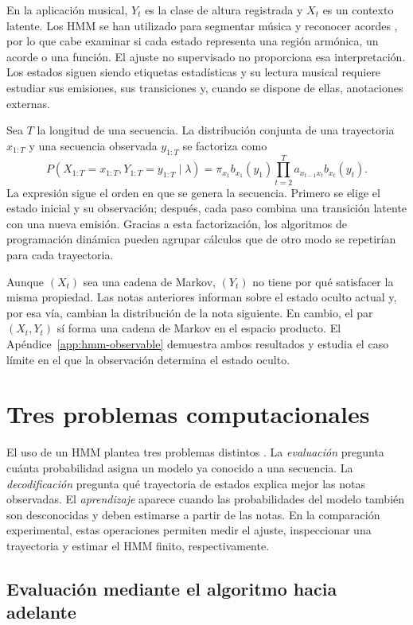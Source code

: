 En la aplicación musical, $Y_t$ es la clase de altura registrada y $X_t$ es un contexto latente. Los HMM se han utilizado para segmentar música y reconocer acordes \cite{sheh2003}, por lo que cabe examinar si cada estado representa una región armónica, un acorde o una función. El ajuste no supervisado no proporciona esa interpretación. Los estados siguen siendo etiquetas estadísticas y su lectura musical requiere estudiar sus emisiones, sus transiciones y, cuando se dispone de ellas, anotaciones externas.

Sea $T$ la longitud de una secuencia. La distribución conjunta de una trayectoria $x_{1:T}$ y una secuencia observada $y_{1:T}$ se factoriza como
\[
P(X_{1:T}=x_{1:T},Y_{1:T}=y_{1:T}\mid\lambda)
=
\pi_{x_1}b_{x_1}(y_1)
\prod_{t=2}^{T}a_{x_{t-1}x_t}b_{x_t}(y_t).
\]
La expresión sigue el orden en que se genera la secuencia. Primero se elige el estado inicial y su observación; después, cada paso combina una transición latente con una nueva emisión. Gracias a esta factorización, los algoritmos de programación dinámica pueden agrupar cálculos que de otro modo se repetirían para cada trayectoria.

Aunque $(X_t)$ sea una cadena de Markov, $(Y_t)$ no tiene por qué satisfacer la misma propiedad. Las notas anteriores informan sobre el estado oculto actual y, por esa vía, cambian la distribución de la nota siguiente. En cambio, el par $(X_t,Y_t)$ sí forma una cadena de Markov en el espacio producto. El Apéndice~\ref{app:hmm-observable} demuestra ambos resultados y estudia el caso límite en el que la observación determina el estado oculto.

\section{Tres problemas computacionales}

El uso de un HMM plantea tres problemas distintos \cite{rabiner1989}. La \emph{evaluación} pregunta cuánta probabilidad asigna un modelo ya conocido a una secuencia. La \emph{decodificación} pregunta qué trayectoria de estados explica mejor las notas observadas. El \emph{aprendizaje} aparece cuando las probabilidades del modelo también son desconocidas y deben estimarse a partir de las notas. En la comparación experimental, estas operaciones permiten medir el ajuste, inspeccionar una trayectoria y estimar el HMM finito, respectivamente.

\subsection{Evaluación mediante el algoritmo hacia adelante}

